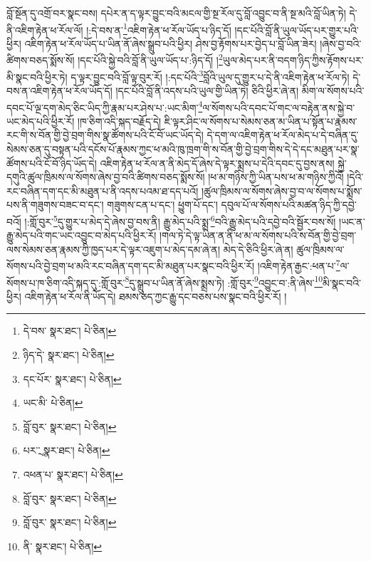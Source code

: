 བློ་སྔོན་དུ་འགྲོ་བར་སྣང་བས། དཔེར་ན་ད་ལྟར་བྱུང་བའི་མངལ་གྱི་སྔ་རོལ་དུ་བློ་འབྱུང་བ་ནི་སྔ་མའི་བློ་ཡིན་ཏེ། དེ་ནི་འཇིག་རྟེན་ཕ་རོལ་ལོ། །:དེ་བས་ན་\footnote{དེ་བས་  སྣར་ཐང་།  པེ་ཅིན། }འཇིག་རྟེན་ཕ་རོལ་ཡོད་པ་ཉིད་དོ། །དང་པོའི་བློ་ནི་ཡུལ་ཡོད་པར་གྱུར་པའི་ཕྱིར། འཇིག་རྟེན་ཕ་རོལ་ཡོད་པ་ཡིན་ནོ་ཞེས་སྒྲུབ་པའི་ཕྱིར། ཤེས་བྱ་རྟོགས་པར་བྱེད་པ་བློ་ཡིན་ཟེར། །ཞེས་བྱ་བའི་ཚིགས་བཅད་སྨོས་སོ། །དང་པོའི་སྐྱེ་བའི་བློ་ནི་ཡུལ་ཡོད་པ་:ཉིད་དོ། །\footnote{ཉིད་དེ་  སྣར་ཐང་།  པེ་ཅིན། }ཡུལ་མེད་པར་ནི་བདག་ཉིད་ཀྱིས་རྟོགས་པར་མི་སྣང་བའི་ཕྱིར་ཏེ། ད་ལྟར་བྱུང་བའི་བློ་ལྟ་བུར་རོ། །:དང་པོའི་\footnote{དང་པོར་  སྣར་ཐང་།  པེ་ཅིན། }བློའི་ཡུལ་དུ་གྱུར་པ་དེ་ནི་འཇིག་རྟེན་ཕ་རོལ་ཏེ། དེ་བས་ན་འཇིག་རྟེན་ཕ་རོལ་ཡོད་དོ། །དང་པོའི་བློ་ནི་འདས་པའི་ཡུལ་གྱི་ཡིན་ཏེ། ཅིའི་ཕྱིར་ཞེ་ན། མིག་ལ་སོགས་པའི་དབང་པོ་ལྔ་དག་མེད་ཅིང་ཡིད་ཀྱི་རྣམ་པར་ཤེས་པ་:ཡང་མིག་\footnote{ཡང་མི་  པེ་ཅིན། }ལ་སོགས་པའི་དབང་པོ་གང་ལ་བརྟེན་ནས་སྐྱེ་བ་ཡང་མེད་པའི་ཕྱིར་རོ། །ཁ་ཅིག་འདི་སྐད་བརྗོད་དེ། ཇི་ལྟར་ཤིང་ལ་སོགས་པ་སེམས་ཅན་མ་ཡིན་པ་སྟོན་པ་རྣམས་རང་གི་ས་བོན་གྱི་བྱེ་བྲག་གིས་སྣ་ཚོགས་པའི་ངོ་བོ་ཡང་ཡོད་དེ། དེ་དག་ལ་འཇིག་རྟེན་ཕ་རོལ་མེད་པ་དེ་བཞིན་དུ་སེམས་ཅན་དུ་བསྟན་པའི་དངོས་པོ་རྣམས་ཀྱང་ཕ་མའི་ཁུ་ཁྲག་གི་ས་བོན་གྱི་བྱེ་བྲག་གིས་དེ་དེ་དང་མཐུན་པར་སྣ་ཚོགས་པའི་ངོ་བོ་ཉིད་ཡོད་དེ། འཇིག་རྟེན་ཕ་རོལ་ན་ནི་མེད་དོ་ཞེས་དེ་ལྟར་སྨྲས་པ་དེའི་དབང་དུ་བྱས་ནས། སྐྱེ་དགུའི་ཚུལ་ཁྲིམས་ལ་སོགས་ཞེས་བྱ་བའི་ཚིགས་བཅད་སྨོས་སོ། །ཕ་མ་གཉིས་ཀྱི་ཡིན་པས་ཕ་མ་གཉིས་ཀྱིའོ། །དེའི་རང་བཞིན་དག་དང་མི་མཐུན་པ་ནི་འདས་པའམ་ཐ་དད་པའོ། །ཚུལ་ཁྲིམས་ལ་སོགས་ཞེས་བྱ་བ་ལ་སོགས་པ་སྨོས་པས་ནི་གཟུགས་བཟང་བ་དང་། གཟུགས་ངན་པ་དང་། ཕྱུག་པོ་དང་། དབུལ་པོ་ལ་སོགས་པའི་མཚན་ཉིད་ཀྱི་དབྱེ་བའོ། །:གློ་བུར་\footnote{བློ་བུར་  སྣར་ཐང་།  པེ་ཅིན། }དུ་གྱུར་པ་མེད་དེ་ཞེས་བྱ་བས་ནི། རྒྱུ་མེད་པའི་སྨྲ་\footnote{པར་ྲ་  སྣར་ཐང་།  པེ་ཅིན། }བའི་རྒྱུ་མེད་པའི་དབྱེ་བའི་སྦྱོར་བས་སོ། །ཡང་ན་རྒྱུ་མེད་པའི་གང་ཡང་འབྱུང་བ་མེད་པའི་ཕྱིར་རོ། །གལ་ཏེ་དེ་ལྟ་ཡིན་ན་ནི་ཕ་མ་ལ་སོགས་པའི་ས་བོན་གྱི་བྱེ་བྲག་ལས་སེམས་ཅན་རྣམས་ཀྱི་ཁྱད་པར་དེ་ལྟར་འཇུག་པ་མེད་དམ་ཞེ་ན། མེད་དེ་ཅིའི་ཕྱིར་ཞེ་ན། ཚུལ་ཁྲིམས་ལ་སོགས་པའི་བྱེ་བྲག་ཕ་མའི་རང་བཞིན་དག་དང་མི་མཐུན་པར་སྣང་བའི་ཕྱིར་རོ། །འཇིག་རྟེན་རྒྱང་:ཕན་པ་\footnote{འཕན་པ་  སྣར་ཐང་།  པེ་ཅིན། }ལ་སོགས་པ་ཁ་ཅིག་འདི་སྐད་དུ་:གློ་བུར་\footnote{བློ་བུར་  སྣར་ཐང་།  པེ་ཅིན། }དུ་སྒྲུབ་པ་ཡིན་ནོ་ཞེས་སྨྲས་ཏེ། :གློ་བུར་\footnote{བློ་བུར་  སྣར་ཐང་།  པེ་ཅིན། }འབྱུང་བ་:ནི་ཞེས་\footnote{ནི་  སྣར་ཐང་།  པེ་ཅིན། }མི་སྣང་བའི་ཕྱིར། འཇིག་རྟེན་ཕ་རོལ་ནི་ཡོད་དེ། ཐམས་ཅད་ཀྱང་རྒྱུ་དང་བཅས་པས་སྣང་བའི་ཕྱིར་རོ། །
